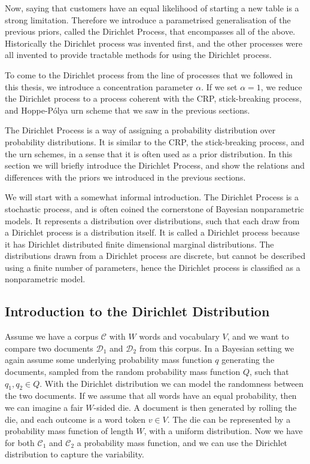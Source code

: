Now, saying that customers have an equal likelihood of starting a new table is a strong limitation. Therefore we introduce a parametrised generalisation of the previous priors, called the Dirichlet Process, that encompasses all of the above. Historically the Dirichlet process was invented first, and the other processes were all invented to provide tractable methods for using the Dirichlet process. 

To come to the Dirichlet process from the line of processes that we followed in this thesis, we introduce a concentration parameter $\alpha $. If we set $\alpha = 1$, we reduce the Dirichlet process to a process coherent with the CRP, stick-breaking process, and Hoppe-P\'olya urn scheme that we saw in the previous sections.  

The Dirichlet Process is a way of assigning a probability distribution over probability distributions. It is similar to the CRP, the stick-breaking process, and the urn schemes, in a sense that it is often used as a prior distribution. In this section we will briefly introduce the Dirichlet Process, and show the relations and differences with the priors we introduced in the previous sections.

We will start with a somewhat informal introduction. The Dirichlet Process is a stochastic process, and is often coined the cornerstone of Bayesian nonparametric models. It represents a distribution over distributions, such that each draw from a Dirichlet process is a distribution itself. It is called a Dirichlet process because it has Dirichlet distributed finite dimensional marginal distributions. The distributions drawn from a Dirichlet process are discrete, but cannot be described using a finite number of parameters, hence the Dirichlet process is classified as a nonparametric model.

\subsection{Introduction to the Dirichlet Distribution}

Assume we have a corpus $\mathcal{C}$ with $W$ words and vocabulary $V$, and we want to compare two documents $\mathcal{D}_1$ and $\mathcal{D}_2$ from this corpus. In a Bayesian setting we again assume some underlying probability mass function $q$ generating the documents, sampled from the random probability mass function $Q$, such that $q_1,q_2\in Q$. With the Dirichlet distribution we can model the randomness between the two documents. If we assume that all words have an equal probability, then we can imagine a fair $W$-sided die. A document is then generated by rolling the die, and each outcome is a word token $v\in V$. The die can be represented by a probability mass function of length $W$, with a uniform distribution. Now we have for both $\mathcal{C}_1$ and $\mathcal{C}_2$ a probability mass function, and we can use the Dirichlet distribution to capture the variability.

